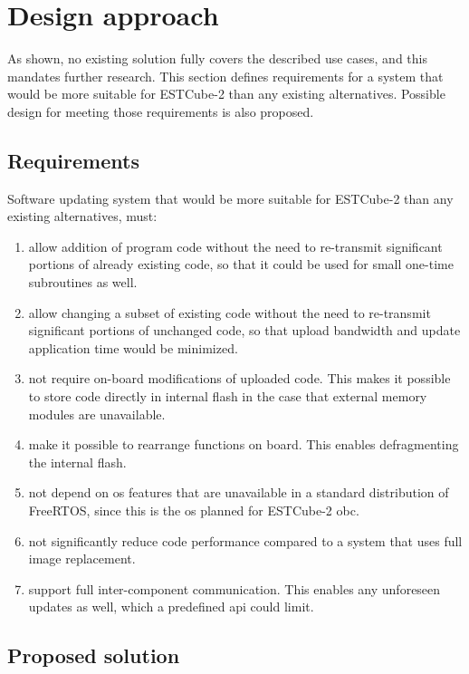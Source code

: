 \newpage
\section{Design approach}
\label{s:design}

As shown, no existing solution fully covers the described use cases, and this mandates further research. This section defines requirements for a system that would be more suitable for ESTCube-2 than any existing alternatives. Possible design for meeting those requirements is also proposed.

\subsection{Requirements}

Software updating system that would be more suitable for ESTCube-2 than any existing alternatives, must:

\begin{enumerate}
	\item allow addition of program code without the need to re-transmit significant portions of already existing code, so that it could be used for small one-time subroutines as well.
	\item allow changing a subset of existing code without the need to re-transmit significant portions of unchanged code, so that upload bandwidth and update application time would be minimized.
	\item not require on-board modifications of uploaded code. This makes it possible to store code directly in internal flash in the case that external memory modules are unavailable.
	\item make it possible to rearrange functions on board. This enables defragmenting the internal flash.
	\item not depend on \gls{os} features that are unavailable in a standard distribution of Free\-RTOS, since this is the \gls{os} planned for ESTCube-2 \gls{obc}.
	\item not significantly reduce code performance compared to a system that uses full image replacement.
	\item support full inter-component communication. This enables any unforeseen updates as well, which a predefined \gls{api} could limit.
\end{enumerate}

\subsection{Proposed solution}

